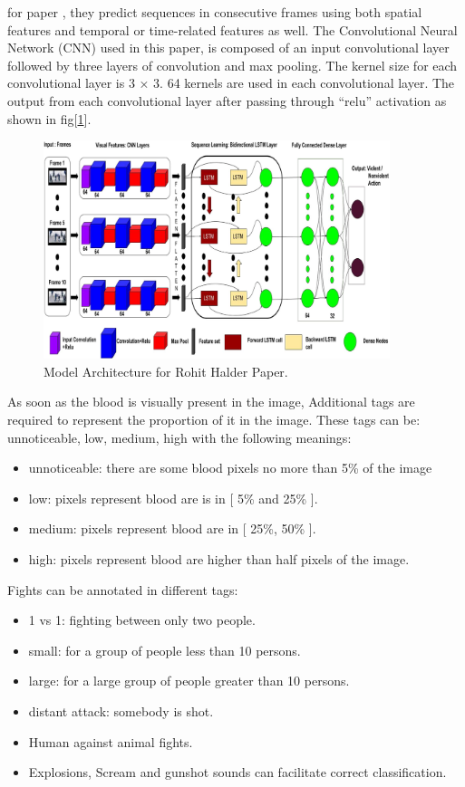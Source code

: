 \documentclass[runningheads]{llncs}
\begin{document}
for paper \cite{halder2020cnn}, they predict sequences in consecutive frames using both spatial features and temporal or time-related features as well. The Convolutional Neural Network (CNN) used in this paper, is composed of an input convolutional layer followed by three layers of convolution and max pooling. The kernel size for each convolutional layer is 3 × 3. 64 kernels are used in each convolutional layer. The output from each convolutional layer after passing through “relu” activation as shown in fig[\ref{violenceHalderCnn}].\\

\begin{figure}
\centering
\includegraphics[width=0.9\textwidth]{figures/violenceHalderCnn.png}
\caption{Model Architecture for Rohit Halder Paper.} \label{violenceHalderCnn}
\end{figure}

As soon as the blood is visually present in the image, Additional tags are required to represent the proportion of it in the image. These tags can be: unnoticeable, low, medium, high with the following meanings:
\begin{itemize}
 \item unnoticeable: there are some blood pixels no more than 5\% of the image
 \item low: pixels represent blood are is in [ 5\% and 25\% ].
 \item medium: pixels represent blood are in [ 25\%, 50\% ].
 \item high: pixels represent blood are higher than half pixels of the image.
\end{itemize}

Fights can be annotated in different tags:
\begin{itemize}
 \item 1 vs 1: fighting between only two people.
 \item small: for a group of people less than 10 persons.
 \item large: for a large group of people greater than 10 persons.
 \item distant attack: somebody is shot.
 \item Human against animal fights.
 \item Explosions, Scream and gunshot sounds can facilitate correct classification.
\end{itemize}
\end{document}
